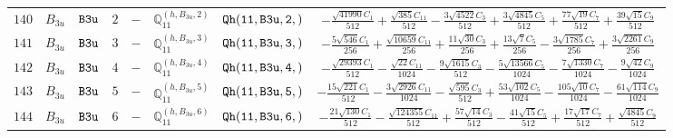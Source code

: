 \documentclass[fleqn,8pt]{jsarticle}
\begin{document}
\begin{table}[ht!]
\begin{center}
\begin{tabular}{cccccccc}
$ 140 $ & $ B_{3u} $ & $ {\tt B3u} $ & $ 2 $ & $ - $ & $ \mathbb{Q}_{11}^{(h,B_{3u},2)} $ & $ {\tt Qh(11,B3u,2,)} $ & $ - \frac{\sqrt{41990} C_{1}}{512} + \frac{\sqrt{385} C_{11}}{512} - \frac{3 \sqrt{4522} C_{3}}{512} + \frac{3 \sqrt{4845} C_{5}}{512} + \frac{77 \sqrt{19} C_{7}}{512} + \frac{39 \sqrt{15} C_{9}}{512} $ \\
$ 141 $ & $ B_{3u} $ & $ {\tt B3u} $ & $ 3 $ & $ - $ & $ \mathbb{Q}_{11}^{(h,B_{3u},3)} $ & $ {\tt Qh(11,B3u,3,)} $ & $ - \frac{5 \sqrt{546} C_{1}}{256} + \frac{\sqrt{10659} C_{11}}{256} + \frac{11 \sqrt{30} C_{3}}{256} + \frac{13 \sqrt{7} C_{5}}{256} - \frac{3 \sqrt{1785} C_{7}}{256} + \frac{3 \sqrt{2261} C_{9}}{256} $ \\
$ 142 $ & $ B_{3u} $ & $ {\tt B3u} $ & $ 4 $ & $ - $ & $ \mathbb{Q}_{11}^{(h,B_{3u},4)} $ & $ {\tt Qh(11,B3u,4,)} $ & $ - \frac{\sqrt{29393} C_{1}}{512} - \frac{\sqrt{22} C_{11}}{1024} - \frac{9 \sqrt{1615} C_{3}}{512} - \frac{5 \sqrt{13566} C_{5}}{1024} - \frac{7 \sqrt{1330} C_{7}}{1024} - \frac{9 \sqrt{42} C_{9}}{1024} $ \\
$ 143 $ & $ B_{3u} $ & $ {\tt B3u} $ & $ 5 $ & $ - $ & $ \mathbb{Q}_{11}^{(h,B_{3u},5)} $ & $ {\tt Qh(11,B3u,5,)} $ & $ - \frac{15 \sqrt{221} C_{1}}{512} - \frac{3 \sqrt{2926} C_{11}}{1024} - \frac{\sqrt{595} C_{3}}{512} + \frac{53 \sqrt{102} C_{5}}{1024} - \frac{105 \sqrt{10} C_{7}}{1024} - \frac{61 \sqrt{114} C_{9}}{1024} $ \\
$ 144 $ & $ B_{3u} $ & $ {\tt B3u} $ & $ 6 $ & $ - $ & $ \mathbb{Q}_{11}^{(h,B_{3u},6)} $ & $ {\tt Qh(11,B3u,6,)} $ & $ - \frac{21 \sqrt{130} C_{1}}{512} - \frac{\sqrt{124355} C_{11}}{512} + \frac{57 \sqrt{14} C_{3}}{512} - \frac{41 \sqrt{15} C_{5}}{512} + \frac{17 \sqrt{17} C_{7}}{512} + \frac{\sqrt{4845} C_{9}}{512} $ \\
 \hline \hline
\end{tabular}
\end{center}
\end{table}
\end{document}
